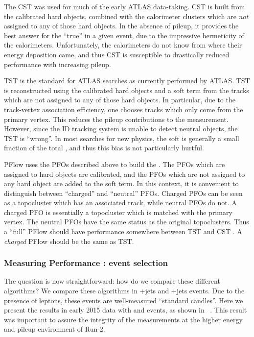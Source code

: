 The CST \met was used for much of the early ATLAS data-taking.
CST \met is built from the calibrated hard objects, combined with the calorimeter clusters which are \textit{not} assigned to any of those hard objects.
In the absence of pileup, it provides the best answer for the ``true'' \met in a given event, due to the impressive hermeticity of the calorimeters.
Unfortunately, the calorimeters do not know from where their energy deposition came, and thus CST is susceptible to drastically reduced performance with increasing pileup.

TST \met is the standard for ATLAS searches as currently performed by ATLAS.
TST \met is reconstructed using the calibrated hard objects and a soft term from the tracks which are not assigned to any of those hard objects.
In particular, due to the track-vertex association efficiency, one chooses tracks which only come from the primary vertex.
This reduces the pileup contributions to the \met measurement.
However, since the ID tracking system is unable to detect neutral objects, the TST \met is ``wrong''.
In most searches for new physics, the soft \met is generally a small fraction of the total \met, and thus this bias is not particularly hurtful.

PFlow \met uses the PFOs described above to build the \met.
The PFOs which are assigned to hard objects are calibrated, and the PFOs which are not assigned to any hard object are added to the soft term.
In this context, it is convenient to distinguish between ``charged'' and ``neutral'' PFOs.
Charged PFOs can be seen as a topocluster which has an associated track, while neutral PFOs do not.
A charged PFO is essentially a topocluster which is matched with the primary vertex.
The neutral PFOs have the same status as the original topoclusters.
Thus a ``full'' PFlow \met should have performance somewhere between TST \met and CST \met\footnotemark.
A \textit{charged} PFlow \met should be the same as TST.


\subsubsection{Measuring \met Performance : event selection}
\label{subsubsec:met_event_selection}
The question is now straightforward: how do we compare these different algorithms?
We compare these algorithms in \Zll+jets and \Wln+jets events.
Due to the presence of leptons, these events are well-measured ``standard candles''.
Here we present the results in early 2015 data with \Zmm and \Wen events, as shown in ~\cite{ATL-PHYS-PUB-2015-023,ATL-PHYS-PUB-2015-027}.
This result was important to assure the integrity of the \met measurements at the higher energy and pileup environment of Run-2.

